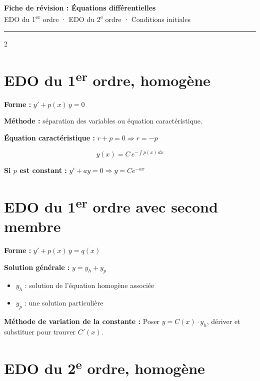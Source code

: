 \documentclass[10pt,a4paper]{article}
\begin{document}
\begin{center}
  {\Large\bfseries\color{bleu} Fiche de révision : Équations différentielles}\\[3pt]
  {\small EDO du 1\textsuperscript{er} ordre · EDO du 2\textsuperscript{e} ordre · Conditions initiales}
\end{center}
\noindent\rule{\linewidth}{0.8pt}

\begin{multicols}{2}

\section{EDO du 1\textsuperscript{er} ordre, homogène}

\begin{grisbox}
\textbf{Forme :} $y' + p(x)\,y = 0$

\textbf{Méthode :} séparation des variables ou équation caractéristique.

\textbf{Équation caractéristique :} $r + p = 0 \Rightarrow r = -p$

$$\boxed{y(x) = C\,e^{-\int p(x)\,dx}}$$

\textbf{Si $p$ est constant :} $y' + ay = 0 \Rightarrow y = Ce^{-ax}$
\end{grisbox}

\section{EDO du 1\textsuperscript{er} ordre avec second membre}

\begin{grisbox}
\textbf{Forme :} $y' + p(x)\,y = q(x)$

\textbf{Solution générale :} $y = y_h + y_p$
\begin{itemize}[leftmargin=1em,itemsep=1pt]
  \item $y_h$ : solution de l'équation homogène associée
  \item $y_p$ : une solution particulière
\end{itemize}

\textbf{Méthode de variation de la constante :}
Poser $y = C(x)\cdot y_h$, dériver et substituer pour trouver $C'(x)$.
\end{grisbox}

\section{EDO du 2\textsuperscript{e} ordre, homogène}


\end{multicols}
\end{document}
